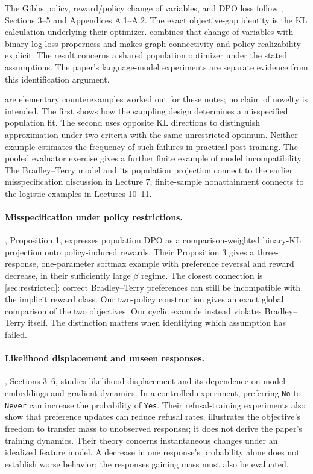 \documentclass[11pt,twoside]{article}
\theoremstyle{definition}
\theoremstyle{remark}
\begin{document}
The Gibbs policy, reward/policy change of variables, and DPO loss follow
\citet{rafailov2023}, Sections 3--5 and Appendices A.1--A.2. The exact
objective-gap identity is the KL calculation underlying their optimizer.
 combines that change of variables with binary log-loss
properness and makes graph connectivity and policy realizability explicit.
The result concerns a shared population optimizer under the stated
assumptions. The paper's language-model experiments are separate evidence
from this identification argument.

 are elementary counterexamples
worked out for these notes; no claim of novelty is intended. The first
shows how the sampling design determines a misspecified population fit.
The second uses opposite KL directions to distinguish approximation under
two criteria with the same unrestricted optimum. Neither example estimates
the frequency of such failures in practical post-training. The pooled
evaluator exercise gives a further finite example of model incompatibility.
The Bradley--Terry model and its population projection connect to the earlier
misspecification discussion in Lecture 7; finite-sample nonattainment
connects to the logistic examples in Lectures 10--11.

\paragraph{Misspecification under policy restrictions.}
\citet{gopalan2026}, Proposition 1, expresses population DPO as a
comparison-weighted binary-KL projection onto policy-induced rewards.
Their Proposition 3 gives a three-response, one-parameter softmax example
with preference reversal and reward decrease, in their sufficiently large
$\beta$ regime. The closest connection is \cref{sec:restricted}:
correct Bradley--Terry preferences can still be incompatible with the
implicit reward class. Our two-policy construction gives an exact global
comparison of the two objectives. Our cyclic example instead violates
Bradley--Terry itself. The distinction matters when identifying which
assumption has failed.

\paragraph{Likelihood displacement and unseen responses.}
\citet{razin2025}, Sections 3--6, studies likelihood displacement and its
dependence on model embeddings and gradient dynamics. In a controlled
experiment, preferring \texttt{No} to \texttt{Never} can increase the
probability of \texttt{Yes}. Their refusal-training experiments also show
that preference updates can reduce refusal rates. 
illustrates the objective's freedom to transfer mass to unobserved responses;
it does not derive the paper's training dynamics. Their theory concerns
instantaneous changes under an idealized feature model. A decrease in one
response's probability alone does not establish worse behavior; the
responses gaining mass must also be evaluated.
\end{document}
